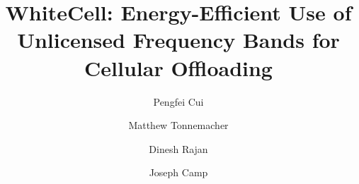 \documentclass[10pt,conference]{IEEEtran}
\begin{document}
\title{WhiteCell: Energy-Efficient Use of Unlicensed Frequency Bands for Cellular Offloading}
\author{Pengfei Cui}
\author{Matthew Tonnemacher}
\author{Dinesh Rajan}
\author{Joseph Camp}



\maketitle













\end{document}
